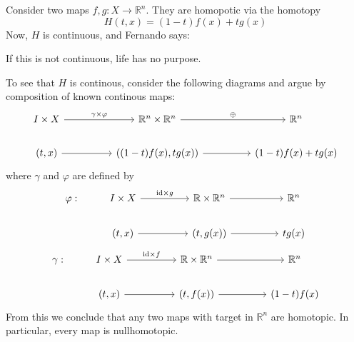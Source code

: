 \begin{example}
    Consider two maps \( f, g: X \to \mathbb{R}^n \).
    They are homopotic via the homotopy
    \begin{equation}
        H(t, x) = (1-t) f(x) + t g(x)
    \end{equation}
    Now, \( H \) is continuous, and Fernando says:
    \begin{displayquote}
      If this is not continuous, life has no purpose.
    \end{displayquote}
    To see that \( H \) is continous, consider the following
    diagrams and argue by composition of known continous maps:
\[\begin{tikzcd}
	{I \times X} && {\mathbb{R}^n \times \mathbb{R}^n} && {\mathbb{R}^n} \\
	{(t,x)} && {((1-t)f(x),tg(x))} && {(1-t)f(x) + tg(x)}
	\arrow["{\gamma\times\varphi}", from=1-1, to=1-3]
	\arrow["\oplus", from=1-3, to=1-5]
	\arrow[from=2-1, to=2-3]
	\arrow[from=2-3, to=2-5]
\end{tikzcd}\]
where \( \gamma \) and \( \varphi \) are defined by
\[\begin{tikzcd}
	{\varphi:} & {I \times X} && {\mathbb{R} \times \mathbb{R}^n} && {\mathbb{R}^n} \\
	& {(t,x)} && {(t,g(x))} && {tg(x)}
	\arrow["{\text{id}\times g}", from=1-2, to=1-4]
	\arrow[from=1-4, to=1-6]
	\arrow[from=2-2, to=2-4]
	\arrow[from=2-4, to=2-6]
\end{tikzcd}\]
\[\begin{tikzcd}
	{\gamma:} & {I \times X} && {\mathbb{R} \times \mathbb{R}^n} && {\mathbb{R}^n} \\
	& {(t,x)} && {(t,f(x))} && {(1-t)f(x)}
	\arrow["{\text{id}\times f}", from=1-2, to=1-4]
	\arrow[from=1-4, to=1-6]
	\arrow[from=2-2, to=2-4]
	\arrow[from=2-4, to=2-6]
\end{tikzcd}\]
From this we conclude that any
two maps with target in \( \mathbb{R}^n \)
are homotopic. In particular, every
map is nullhomotopic.
\end{example}

